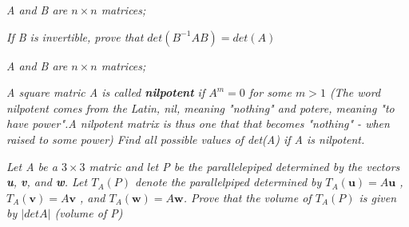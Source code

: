 \documentclass[12pt,letterpaper]{hmcpset}
\begin{document}
\begin{solution}
\end{solution}

\newpage



\begin{problem}[4.2.54]
\textit{A and B are $n\times n$ matrices;}
\begin{center}
\textit{If B is invertible, prove that $det (B^{-1}AB)= det(A)$}
\end{center}
\end{problem}

\begin{solution}
\end{solution}

\newpage


\begin{problem}[4.2.56]
\textit{A and B are $n\times n$ matrices;}
\begin{center}
\textit{ A square matric A is called \textbf{nilpotent} if $A^m = 0$ for some $m > 1$ (The word nilpotent comes from the Latin, nil, meaning "nothing" and potere, meaning "to have power".A nilpotent matrix is thus one that that becomes "nothing" - when raised to some power) Find all possible values of det(A) if A is nilpotent.}
\end{center}
\end{problem}

\begin{solution}
\end{solution}

\newpage


\begin{problem}[Exploration 10]

\textit{Let A be a $3\times3$ matric and let P be the parallelepiped determined by the vectors \textbf{u}, \textbf{v}, and \textbf{w}. Let $T_A(P)$ denote the parallelpiped determined by $T_A(\textbf{u})= A\textbf{u}$ , $T_A(\textbf{v})= A\textbf{v}$ , and $T_A(\textbf{w})= A\textbf{w}$. Prove that the volume of $T_A(P)$ is given by $| det A|$ (volume of P)}
\end{problem}
\begin{solution}
\end{solution}

\newpage
\end{document}
